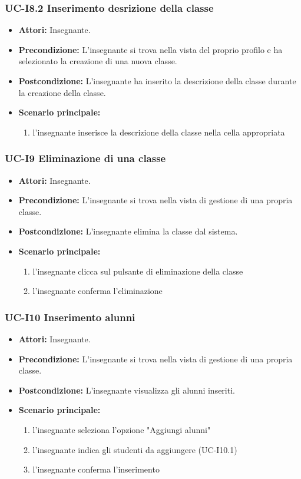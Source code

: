 \subsubsection{UC-I8.2 Inserimento desrizione della classe}
\begin{itemize}
	\item \textbf{Attori:} Insegnante.
	\item \textbf{Precondizione:} L'insegnante si trova nella vista del proprio profilo e ha selezionato la creazione di una nuova classe.
	\item \textbf{Postcondizione:} L'insegnante ha inserito la descrizione della classe durante la creazione della classe.
	\item \textbf{Scenario principale:}
	\begin{enumerate}
		\item l'insegnante inserisce la descrizione della classe nella cella appropriata
	\end{enumerate}
\end{itemize}

\subsubsection{UC-I9 Eliminazione di una classe}
\begin{itemize}
	\item \textbf{Attori:} Insegnante.
	\item \textbf{Precondizione:} L'insegnante si trova nella vista di gestione di una propria classe.
	\item \textbf{Postcondizione:} L'insegnante elimina la classe dal sistema.
	\item \textbf{Scenario principale:}
	\begin{enumerate}
		\item l'insegnante clicca sul pulsante di eliminazione della classe
		\item l'insegnante conferma l'eliminazione
	\end{enumerate}
\end{itemize}

\subsubsection{UC-I10 Inserimento alunni}
\begin{itemize}
	\item \textbf{Attori:} Insegnante.
	\item \textbf{Precondizione:} L'insegnante si trova nella vista di gestione di una propria classe.
	\item \textbf{Postcondizione:} L'insegnante visualizza gli alunni inseriti.
	\item \textbf{Scenario principale:}
	\begin{enumerate}
		\item l'insegnante seleziona l'opzione "Aggiungi alunni"
		\item l'insegnante indica gli studenti da aggiungere (UC-I10.1)
		\item l'insegnante conferma l'inserimento
	\end{enumerate}
\end{itemize}

